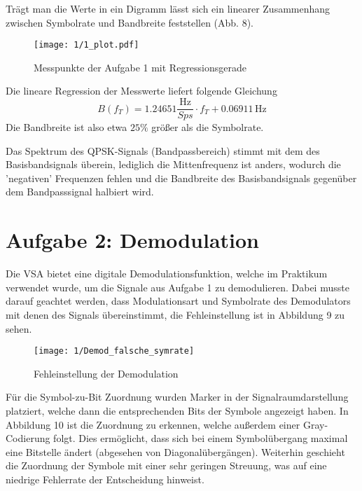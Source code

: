 \documentclass[a4paper, 12pt]{article}
\begin{document}
  Trägt man die Werte in ein Digramm lässt sich ein linearer Zusammenhang
  zwischen Symbolrate und Bandbreite feststellen (Abb. 8).

  \begin{figure}[H]
    \begin{center}
      \texttt{[image: 1/1\_plot.pdf]}
    \end{center}
    \caption{Messpunkte der Aufgabe 1 mit Regressionsgerade}
  \end{figure}

  \noindent Die lineare Regression der Messwerte liefert folgende Gleichung
  \begin{equation}
    B(f_T) = 1.24651 \frac{\si{\hertz}}{\si{Sps}} \cdot f_T + 0.06911 \, \si{\hertz}
    \end{equation}
  Die Bandbreite ist also etwa $25 \%$ größer als die Symbolrate.


  Das Spektrum des QPSK-Signals (Bandpassbereich) stimmt mit dem des
  Basisbandsignals überein, lediglich die Mittenfrequenz ist anders, wodurch die
  'negativen' Frequenzen fehlen und die Bandbreite des Basisbandsignals
  gegenüber dem Bandpasssignal halbiert wird.

  
  
  \section{Aufgabe 2: Demodulation}

  Die VSA bietet eine digitale Demodulationsfunktion, welche im Praktikum verwendet
  wurde, um die Signale aus Aufgabe 1 zu demodulieren. Dabei musste darauf
  geachtet werden, dass Modulationsart und Symbolrate des Demodulators mit denen
  des Signals übereinstimmt, die Fehleinstellung ist in Abbildung 9 zu sehen.

  \begin{figure}[H]
    \begin{center}
      \texttt{[image: 1/Demod\_falsche\_symrate]}
    \end{center}
    \caption{Fehleinstellung der Demodulation}
  \end{figure}

  Für die Symbol-zu-Bit Zuordnung wurden Marker in der Signalraumdarstellung
  platziert, welche dann die entsprechenden Bits der Symbole angezeigt haben.
  In Abbildung 10 ist die Zuordnung zu erkennen, welche außerdem einer
  Gray-Codierung folgt. Dies ermöglicht, dass sich bei einem Symbolübergang
  maximal eine Bitstelle ändert (abgesehen von Diagonalübergängen). Weiterhin
  geschieht die Zuordnung der Symbole mit einer sehr geringen Streuung, was auf eine
  niedrige Fehlerrate der Entscheidung hinweist.
\end{document}
